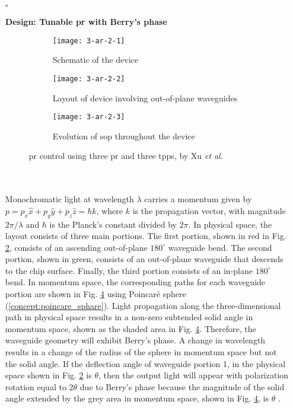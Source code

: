 \documentclass[../report.tex]{subfiles}
\begin{document}
	\begin{itemize}[leftmargin=*]
		
		\item[$\square$]\begin{minipage}[t]{\textwidth}\textbf{Design: Tunable \gls{pr} with Berry's phase}
			\begin{figure}[H] %
				\begin{subfigure}[t]{0.33\textwidth}
					\texttt{[image: 3-ar-2-1]}
					\caption{Schematic of the device}
					\label{fig:3_ar_2_1}
				\end{subfigure}
				\hfill
				\begin{subfigure}[t]{0.33\textwidth}
					\texttt{[image: 3-ar-2-2]}
					\caption{Layout of device involving out-of-plane waveguides}
					\label{fig:3_ar_2_2}
				\end{subfigure}
				\hfill
				\begin{subfigure}[t]{0.27\textwidth}
					\texttt{[image: 3-ar-2-3]}
					\caption{Evolution of \gls{sop} throughout the device}
					\label{fig:3_ar_2_3}
				\end{subfigure}
				\caption{\gls{pr} control using three \gls{pr} and three \gls{tpps}, by Xu \textit{et al.} \cite{xu_electrically_2014}}
			\end{figure}
		\end{minipage}\\\\
		\noindent Monochromatic light at wavelength $\lambda$ carries a momentum given by $p = p_{x}\widehat {x}+p_{y}\widehat {y}+p_{z}\widehat {z} = \hbar k$, where $k$ is the propagation vector, with magnitude $2\pi/\lambda$ and $\hbar$ is the Planck’s constant divided by $2\pi$. In physical space, the layout consists of three main portions. The first portion, shown in red in Fig. \ref{fig:3_ar_2_2}, consists of an ascending out-of-plane $180^{\circ}$ waveguide bend. The second portion, shown in green, consists of an out-of-plane waveguide that descends to the chip surface. Finally, the third portion consists of an in-plane $180^{\circ}$ bend. In momentum space, the corresponding paths for each waveguide portion are shown in Fig. \ref{fig:3_ar_2_3} using Poincaré sphere (\ref{concept:poincare_sphare}). Light propagation along the three-dimensional path in physical space results in a non-zero subtended solid angle in momentum space, shown as the shaded area in Fig. \ref{fig:3_ar_2_3}. Therefore, the waveguide geometry will exhibit Berry’s phase. A change in wavelength results in a change of the radius of the sphere in momentum space but not the solid angle. If the deflection angle of waveguide portion 1, in the physical space shown in Fig. \ref{fig:3_ar_2_2} is $\theta$, then the output light will appear with polarization rotation equal to $2\theta$ due to Berry’s phase because the magnitude of the solid angle extended by the grey area in momentum space, shown in Fig. \ref{fig:3_ar_2_3}, is $\theta$ \cite{xu_electrically_2014}.
		

\end{itemize}
\end{document}

